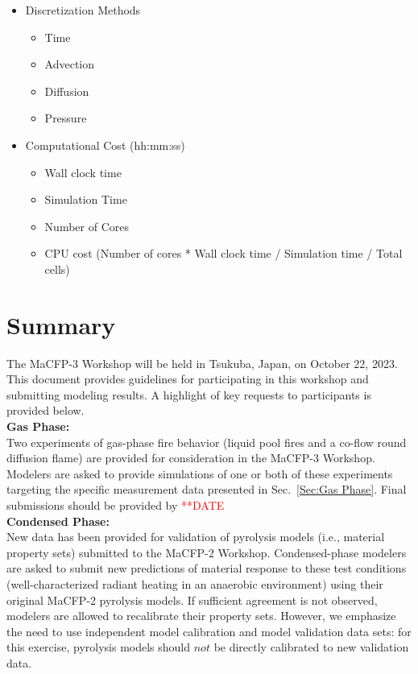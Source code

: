 \documentclass[12pt]{article}
\begin{document}
\begin{itemize}[noitemsep]
 \item Discretization Methods
 	\begin{itemize}[noitemsep]
 	\item Time
 	\item Advection
 	\item Diffusion
 	\item Pressure
 	\end{itemize}
 \item Computational Cost (hh:mm:ss)
 	\begin{itemize}[noitemsep]
 	\item Wall clock time
 	\item Simulation Time
 	\item Number of Cores
 	\item CPU cost (Number of cores * Wall clock time / Simulation time / Total cells)
 	\end{itemize}
\end{itemize}

\clearpage
\section{Summary}
\label{Sec:Summary}
The MaCFP-3 Workshop will be held in Tsukuba, Japan, on October 22, 2023. This document provides guidelines for participating in this workshop and submitting modeling results. A highlight of key requests to participants is provided below.\\

\textbf{Gas Phase:}\\
Two experiments of gas-phase fire behavior (liquid pool fires and a co-flow round diffusion flame) are provided for consideration in the MaCFP-3 Workshop. Modelers are asked to provide simulations of one or both of these experiments targeting the specific measurement data presented in Sec.~\ref{Sec:Gas Phase}. Final submissions should be provided by \textcolor{red}{**DATE}\\

\textbf{Condensed Phase:}\\
New data has been provided for validation of pyrolysis models (i.e., material property sets) submitted to the MaCFP-2 Workshop. Condensed-phase modelers are asked to submit new predictions of material response to these test conditions (well-characterized radiant heating in an anaerobic environment) using their original MaCFP-2 pyrolysis models. If sufficient agreement is not observed, modelers are allowed to recalibrate their property sets. However, we emphasize the need to use independent model calibration and model validation data sets: for this exercise, pyrolysis models should $not$ be directly calibrated to new validation data.  
\end{document}
